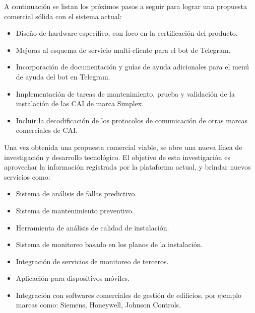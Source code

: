 A continuación se listan los próximos pasos a seguir para lograr una propuesta comercial sólida con el sistema actual:
\begin{itemize}
\item Diseño de hardware específico, con foco en la certificación del producto.
\item Mejoras al esquema de servicio multi-cliente para el bot de Telegram.
\item Incorporación de documentación y guías de ayuda adicionales para el menú de ayuda del bot en Telegram.
\item Implementación de tareas de mantenimiento, prueba y validación de la instalación de las CAI de marca Simplex.
\item Incluir la decodificación de los protocolos de comunicación de otras marcas comerciales de CAI.
\end{itemize}

Una vez obtenida una propuesta comercial viable, se abre una nueva línea de investigación y desarrollo tecnológico. El objetivo de esta investigación es aprovechar la información registrada por la plataforma actual, y brindar nuevos servicios como:
\begin{itemize}
\item Sistema de análisis de fallas predictivo.
\item Sistema de mantenimiento preventivo.
\item Herramienta de análisis de calidad de instalación.
\item Sistema de monitoreo basado en los planos de la instalación.
\item Integración de servicios de monitoreo de terceros.
\item Aplicación para dispositivos móviles.
\item Integración con softwares comerciales de gestión de edificios, por ejemplo marcas como: Siemens, Honeywell, Johnson Controls.
\end{itemize}
